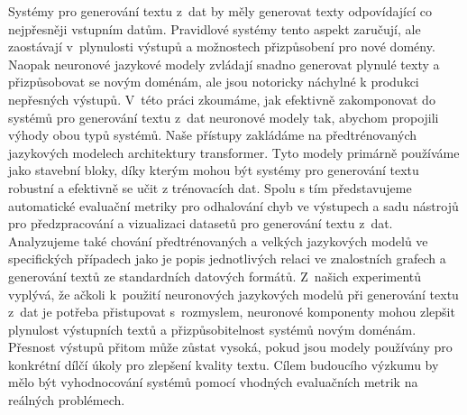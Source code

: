 Systémy pro generování textu z~dat by měly generovat texty odpovídající co nejpřesněji vstupním datům. Pravidlové systémy tento aspekt zaručují, ale zaostávají v~plynulosti výstupů a možnostech přizpůsobení pro nové domény. Naopak neuronové jazykové modely zvládají snadno generovat plynulé texty a přizpůsobovat se novým doménám, ale jsou notoricky náchylné k produkci nepřesných výstupů. V~této práci zkoumáme, jak efektivně zakomponovat do systémů pro generování textu z~dat neuronové modely tak, abychom propojili výhody obou typů systémů. Naše přístupy zakládáme na předtrénovaných jazykových modelech architektury transformer. Tyto modely primárně používáme jako stavební bloky, díky kterým mohou být systémy pro generování textu robustní a efektivně se učit z trénovacích dat. Spolu s tím představujeme automatické evaluační metriky pro odhalování chyb ve výstupech a sadu nástrojů pro předzpracování a vizualizaci datasetů pro generování textu z~dat. Analyzujeme také chování předtrénovaných a velkých jazykových modelů ve specifických případech jako je popis jednotlivých relaci ve znalostních grafech a generování textů ze standardních datových formátů. Z~našich experimentů vyplývá, že ačkoli k~použití neuronových jazykových modelů při generování textu z~dat je potřeba přistupovat s~rozmyslem, neuronové komponenty mohou zlepšit plynulost výstupních textů a přizpůsobitelnost systémů novým doménám. Přesnost výstupů přitom může zůstat vysoká, pokud jsou modely používány pro konkrétní dílčí úkoly pro zlepšení kvality textu. Cílem budoucího výzkumu by mělo být vyhodnocování systémů pomocí vhodných evaluačních metrik na reálných problémech.